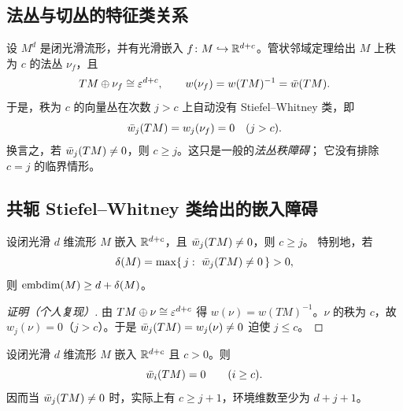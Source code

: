 \subsection{法丛与切丛的特征类关系}

设 $M^{d}$ 是闭光滑流形，并有光滑嵌入 $f\colon M\hookrightarrow\mathbb{R}^{d+c}$。管状邻域定理给出
$M$ 上秩为 $c$ 的法丛 $\nu_f$，且
\begin{equation*}
  TM\oplus\nu_f\cong\varepsilon^{d+c},
  \qquad
  w(\nu_f)=w(TM)^{-1}=\bar w(TM).
\end{equation*}
于是，秩为 $c$ 的向量丛在次数 $j>c$ 上自动没有 Stiefel--Whitney 类，即
\begin{equation*}
  \bar w_j(TM)=w_j(\nu_f)=0\quad (j>c).
\end{equation*}
换言之，若 $\bar w_j(TM)\neq0$，则 $c\ge j$。这只是一般的\emph{法丛秩障碍}；
它没有排除 $c=j$ 的临界情形。

\subsection{共轭 Stiefel--Whitney 类给出的嵌入障碍}

\begin{theorem}[法丛秩障碍]\label{thm:embedding-obstruction}
设闭光滑 $d$ 维流形 $M$ 嵌入 $\mathbb{R}^{d+c}$，且 $\bar w_j(TM)\neq0$，则 $c\ge j$。
特别地，若
\begin{equation}
  \delta(M)=\max\{\,j:\ \wbar_j(TM)\neq0\,\}>0,
  \label{eq:delta}
\end{equation}
则 $\operatorname{embdim}(M)\ge d+\delta(M)$。
\end{theorem}

\begin{proof}[证明（个人复现）]
由 $TM\oplus\nu\cong\varepsilon^{d+c}$ 得 $w(\nu)=w(TM)^{-1}$。$\nu$ 的秩为 $c$，故
$w_j(\nu)=0$（$j>c$）。于是 $\bar w_j(TM)=w_j(\nu)\neq0$ 迫使 $j\le c$。
\end{proof}

\begin{theorem}[欧氏嵌入的临界次数判据]\label{thm:critical}
设闭光滑 $d$ 维流形 $M$ 嵌入 $\mathbb{R}^{d+c}$ 且 $c>0$。则
\begin{equation}
  \bar w_i(TM)=0\qquad(i\ge c).
  \label{eq:critical}
\end{equation}
因而当 $\bar w_j(TM)\neq0$ 时，实际上有 $c\ge j+1$，环境维数至少为 $d+j+1$。
\end{theorem}

